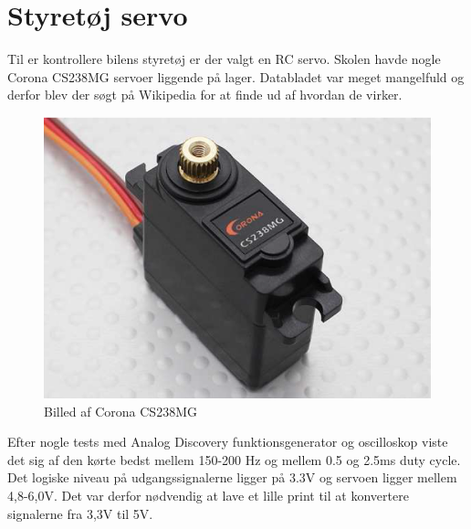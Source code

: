 \section{Styretøj servo} \label{sec:hwi_servo}

Til er kontrollere bilens styretøj er der valgt en RC servo. Skolen havde nogle Corona CS238MG \cite{lib:servo} servoer liggende på lager. Databladet var meget mangelfuld og derfor blev der søgt på Wikipedia \cite{lib:wiki-RC-Servo} for at finde ud af hvordan de virker.

\begin{figure}[h]
	\centering
	\includegraphics[width=\textwidth* 6/10]{../fig/billeder/corona_RC_Servo}
	\caption{Billed af Corona CS238MG}
	\label{fig:Corona_CS238MG}
\end{figure}  

Efter nogle tests med Analog Discovery funktionsgenerator og oscilloskop viste det sig af den kørte bedst mellem 150-200 Hz og mellem 0.5 og 2.5ms duty cycle.
Det logiske niveau på udgangssignalerne ligger på 3.3V og servoen ligger mellem 4,8-6,0V. Det var derfor nødvendig at lave et lille print til at konvertere signalerne fra 3,3V til 5V.  

